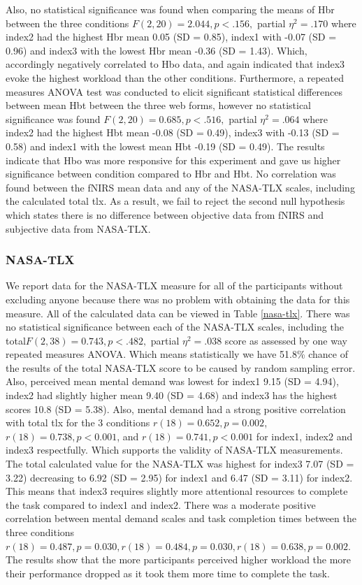 \documentclass[a4paper]{report}
\begin{document}
			Also, no statistical significance was found when comparing the means of Hbr between the three conditions $F(2,20)=2.044, p<.156,$ partial $\eta^{2}=.170$ where index2 had the highest Hbr mean 0.05 (SD = 0.85), index1 with -0.07 (SD = 0.96) and index3 with the lowest Hbr mean -0.36 (SD = 1.43). Which, accordingly negatively correlated to Hbo data, and again indicated that index3 evoke the highest workload than the other conditions. Furthermore, a repeated measures ANOVA test was conducted to elicit significant statistical differences between mean Hbt between the three web forms, however no statistical significance was found $F(2,20)=0.685, p<.516,$ partial $\eta^{2}=.064$ where index2 had the highest Hbt mean -0.08 (SD = 0.49), index3 with -0.13 (SD = 0.58) and index1 with the lowest mean Hbt -0.19 (SD = 0.49). The results indicate that Hbo was more responsive for this experiment and gave us higher significance between condition compared to Hbr and Hbt. 
			No correlation was found between the fNIRS mean data and any of the NASA-TLX scales, including the calculated total tlx. As a result, we fail to reject the second null hypothesis which states there is no difference between objective data from fNIRS and subjective data from NASA-TLX.
			\subsubsection{NASA-TLX}
				We report data for the NASA-TLX measure for all of the participants without excluding anyone because there was no problem with obtaining the data for this measure. All of the calculated data can be viewed in Table \ref{nasa-tlx}.
				There was no statistical significance between each of the NASA-TLX scales, including the total$F(2,38)=0.743, p<.482,$ partial $\eta^{2}=.038$ score as assessed by one way repeated measures ANOVA. Which means statistically we have 51.8\% chance of the results of the total NASA-TLX score to be caused by random sampling error. Also, perceived mean mental demand was lowest for index1 9.15 (SD = 4.94), index2 had slightly higher mean 9.40 (SD = 4.68) and index3 has the highest scores 10.8 (SD = 5.38). Also, mental demand had a strong positive correlation with total tlx for the 3 conditions $r(18)=0.652, p=0.002$, $r(18)=0.738, p<0.001$, and $r(18)=0.741, p<0.001$ for index1, index2 and index3 respectfully. Which supports the validity of NASA-TLX measurements. The total calculated value for the NASA-TLX was highest for index3 7.07 (SD = 3.22) decreasing to 6.92 (SD = 2.95) for index1 and 6.47 (SD = 3.11) for index2. This means that index3 requires slightly more attentional resources to complete the task compared to index1 and index2.
				There was a moderate positive correlation between mental demand scales and task completion times between the three conditions  $r(18)=0.487, p=0.030,  r(18)=0.484, p=0.030,  r(18)=0.638, p=0.002$. The results show that the more participants perceived higher workload the more their performance dropped as it took them more time to complete the task.
				
\end{document}
